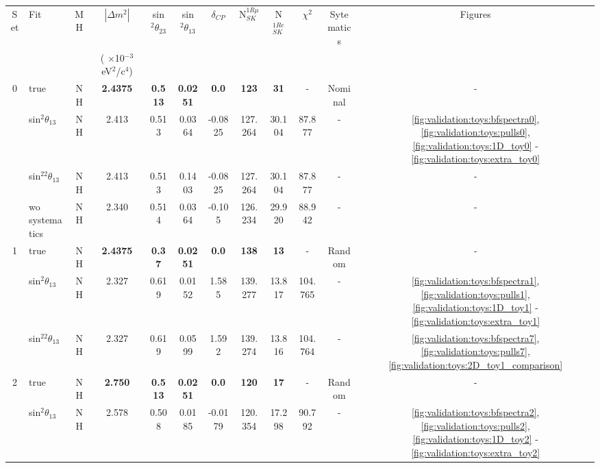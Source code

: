 \begin{table}[htb]
\small
\begin{center}
\begin{tabular}{@{}| c | l | c | c  c  c  c| c  c  | c | c | c |@{}}
\hline
Set & Fit  &  MH & $|\Delta m^2|$  & sin$^2\theta_{23}$ & sin$^2\theta_{13}$  & $\delta_{CP}$  & N$_{SK}^{1R\mu}$ & N$_{SK}^{1Re}$ & $\chi^{2}$ & Sytematics & Figures  \\
 &   &  & ( $\times$10$^{-3}$ eV$^{2}$/c$^{4}$) &  &   &  &   &  & & & \\
\hline
0  & true  & NH & {\bf 2.4375 }   & {\bf 0.513}   & {\bf 0.0251}   & {\bf 0.0} & {\bf 123}   & {\bf 31}   &  - & Nominal & - \\
   &  sin$^2\theta_{13}$  & NH  & 2.413          & 0.513      & 0.0364      & -0.0825   & 127.264    & 30.104   & 87.877  & - &  \ref{fig:validation:toys:bfspectra0},\ref{fig:validation:toys:pulls0}, \ref{fig:validation:toys:1D_toy0} - \ref{fig:validation:toys:extra_toy0} \\
 &  sin$^22\theta_{13}$  & NH  & 2.413          & 0.513      & 0.1403      & -0.0825   & 127.264    & 30.104   & 87.877  & - &  - \\
 &  wo systematics & NH & 2.340          & 0.514      & 0.0364      & -0.105   & 126.234    & 29.920   & 88.942  & - & - \\
\hline
1  & true  & NH & {\bf 2.4375 }   & {\bf 0.37}   & {\bf 0.0251}   & {\bf 0.0} & {\bf 138}   & {\bf 13}   &  - & Random & - \\
   & sin$^2\theta_{13}$  & NH  & 2.327          & 0.619     & 0.0152      & 1.585   & 139.277   & 13.817   & 104.765  & - & \ref{fig:validation:toys:bfspectra1},\ref{fig:validation:toys:pulls1}, \ref{fig:validation:toys:1D_toy1} - \ref{fig:validation:toys:extra_toy1} \\
 & sin$^22\theta_{13}$  & NH  & 2.327          & 0.619      & 0.0599      & 1.592   & 139.274    & 13.816   & 104.764  & - &  \ref{fig:validation:toys:bfspectra7},\ref{fig:validation:toys:pulls7}, \ref{fig:validation:toys:2D_toy1_comparison} \\
\hline
2 & true  & NH & {\bf 2.750 }   & {\bf 0.513}   & {\bf 0.0251}   & {\bf 0.0} & {\bf 120}   & {\bf 17}   &  - & Random & - \\
   & sin$^2\theta_{13}$  & NH  & 2.578          & 0.508      & 0.0185      & -0.0179   & 120.354    & 17.298   & 90.792  & - &  \ref{fig:validation:toys:bfspectra2},\ref{fig:validation:toys:pulls2}, \ref{fig:validation:toys:1D_toy2} - \ref{fig:validation:toys:extra_toy2} \\

\end{tabular}
\end{center}
\end{table}
